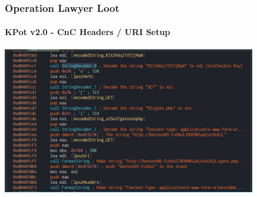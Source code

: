 \documentclass[aspectratio=169]{beamer}
\begin{document}
{
\begin{frame}
  \frametitle{Operation Lawyer Loot}
  \framesubtitle{KPot v2.0 - CnC Headers / URI Setup}
  \begin{center}
    \includegraphics[width=11cm]{kpot-cnc-checkin-routine-uri-setup}
  \end{center}
\end{frame}
}
\end{document}
